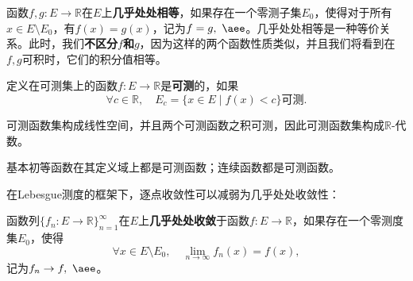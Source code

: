 \begin{example}[几乎处处相等]
    函数$f,g:E\to\mathbb{R}$在$E$上\textbf{几乎处处相等}，如果存在一个零测子集$E_0$，使得对于所有$x\in E\setminus E_0$，有$f(x)=g(x)$，记为$f=g,\ \aee$。几乎处处相等是一种等价关系。此时，我们\textbf{不区分$f$和$g$}，因为这样的两个函数性质类似，并且我们将看到在$f,g$可积时，它们的积分值相等。
\end{example}

\begin{definition}[可测函数]
    定义在可测集上的函数$f:E\to\mathbb{R}$是\textbf{可测}的，如果
    \begin{equation}
        \forall c\in\mathbb{R},\quad E_c=\{x\in E \mid f(x)<c\}\text{可测}.
    \end{equation}
\end{definition}

可测函数集构成线性空间，并且两个可测函数之积可测，因此可测函数集构成$\mathbb{R}$-代数。

\begin{example}
    基本初等函数在其定义域上都是可测函数；连续函数都是可测函数。
\end{example}

%
%
%
%
%
在Lebesgue测度的框架下，逐点收敛性可以减弱为几乎处处收敛性：

\begin{definition}[几乎处处收敛]
    函数列$\{f_n:E\to\mathbb{R}\}_{n=1}^{\infty}$在$E$上\textbf{几乎处处收敛}于函数$f:E\to\mathbb{R}$，如果存在一个零测度集$E_0$，使得
    \begin{equation}
        \forall x\in E\setminus E_0,\quad \lim_{n\to\infty}f_n(x)=f(x),
    \end{equation}
    记为$f_n\to f,\ \aee$。
\end{definition}


